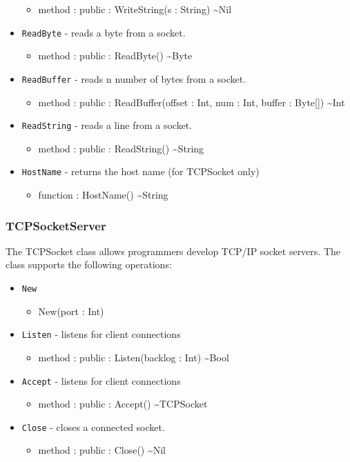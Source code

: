 \documentclass[11pt]{article}
\begin{document}
\begin{itemize}
  \begin{itemize}
  \item method : public : WriteString(s : String) \textasciitilde Nil
  \end{itemize}
\item \texttt{ReadByte} - reads a byte from a socket.
  \begin{itemize}
  \item method : public : ReadByte() \textasciitilde Byte
  \end{itemize}
\item \texttt{ReadBuffer} - reads n number of bytes from a socket.
  \begin{itemize}
  \item method : public : ReadBuffer(offset : Int, num : Int, buffer :
    Byte[]) \textasciitilde Int
  \end{itemize}
\item \texttt{ReadString} - reads a line from a socket.
  \begin{itemize}
  \item method : public : ReadString() \textasciitilde String
  \end{itemize}
\item \texttt{HostName} - returns the host name (for TCPSocket only)
  \begin{itemize}
  \item function : HostName() \textasciitilde String
  \end{itemize}
\end{itemize}

\subsubsection{TCPSocketServer}
The TCPSocket class allows programmers develop TCP/IP socket
servers. The class supports the following operations:
\begin{itemize}
\item \texttt{New}
  \begin{itemize}
  \item New(port : Int)
  \end{itemize}
\item \texttt{Listen} - listens for client connections
  \begin{itemize}
  \item method : public : Listen(backlog : Int) \textasciitilde Bool
  \end{itemize}
\item \texttt{Accept} - listens for client connections
  \begin{itemize}
  \item method : public : Accept() \textasciitilde TCPSocket
  \end{itemize}
\item \texttt{Close} - closes a connected socket.
  \begin{itemize}
  \item method : public : Close() \textasciitilde Nil
  \end{itemize}
\end{itemize}
\end{document}
